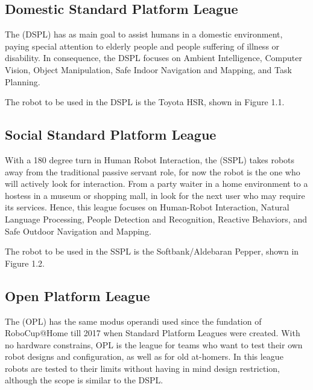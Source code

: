 \subsection{Domestic Standard Platform League}
The (DSPL) has as main goal to assist humans in a domestic environment, paying special attention to elderly people and people suffering of illness or disability. In consequence, the DSPL focuses on Ambient Intelligence, Computer Vision, Object Manipulation, Safe Indoor Navigation and Mapping, and Task Planning.

The robot to be used in the DSPL is the Toyota HSR, shown in Figure 1.1.

\subsection{Social Standard Platform League}
With a 180 degree turn in Human Robot Interaction, the (SSPL) takes robots away from the traditional passive servant role, for now the robot is the one who will actively look for interaction. From a party waiter in a home environment to a hostess in a museum or shopping mall, in  look for the next user who may require its services. Hence, this league focuses on Human-Robot Interaction, Natural Language Processing, People Detection and Recognition, Reactive Behaviors, and Safe Outdoor Navigation and Mapping.

The robot to be used in the SSPL is the Softbank/Aldebaran Pepper, shown in Figure 1.2.

\subsection{Open Platform League}
The (OPL) has the same modus operandi used since the fundation of RoboCup@Home till 2017 when Standard Platform Leagues were created. With no hardware constrains, OPL is the league for teams who want to test their own robot designs and configuration, as well as for old at-homers. In this league robots are tested to their limits without having in mind design restriction, although the scope is similar to the DSPL. 
